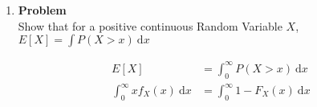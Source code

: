 \documentclass[12pt]{article}
\newenvironment{Ex}{\textbf{Problem}\vspace{.75em}\\}{}
\newcommand{\dd}[1]{\:\mathrm{d}{#1}}
\begin{document}
\begin{enumerate}
\begin{Ex}
\begin{solution}
\begin{enumerate}
\begin{multicols}{2}
        \end{multicols}
      \item $P(X<Y<2)$ can be represented as
        \begin{equation}
          \label{eq:6c-sol}
          \begin{aligned}
            P(X<Y<2) &= \int_0^2\int_0^yf_X(x)f_Y(y)\dd{x}\dd{y} \\
            &=\int_0^2\int_0^y6e^{-(2x+3y)}\dd{x}\dd{y} \\
            &= 3\int_0^2 e^{-3y} - e^{-5y} \dd{y} \\
            \implies P(X<Y<2) &= 0.3976
          \end{aligned}
        \end{equation}
      \item The equation is as follows
        \begin{equation}
          \label{eq:6d-sol}
          P(X\le Y^2) = \int_0^\infty\int_{0}^{y^2}
          f_X(x)f_Y(y)\dd{x}\dd{y}
        \end{equation}
      \item $E[X +Y]$ can be computed as follows
        \begin{equation}
          \label{eq:6e-sol}
          \begin{aligned}
            E[X +Y] &= E[X] + E[Y] \\
            &= \int_0^\infty x \cdot f_X(x) \dd{x} + \int_0^\infty y
            \cdot f_Y(y) \dd{y} \\
            \implies E[X +Y] &= \frac{5}{6}
          \end{aligned}
        \end{equation}
      \end{enumerate}
    \end{solution}
  \end{Ex}
\item
  \begin{Ex}
    Show that for a positive continuous Random Variable $X$, $E[X] =
    \int P(X > x) \dd{x}$
    \begin{solution} \hfill
      \begin{equation}
        \begin{aligned}
          \label{eq:7-sol}
          E[X] &= \int_{0}^{\infty} P(X > x) \dd{x} \\
          \int_{0}^{\infty} x f_X(x) \dd{x} &=
          \int_{0}^{\infty} 1 - F_X(x) \dd{x} \\
        \end{aligned}

\end{equation}
\end{solution}
\end{Ex}
\end{enumerate}
\end{document}
